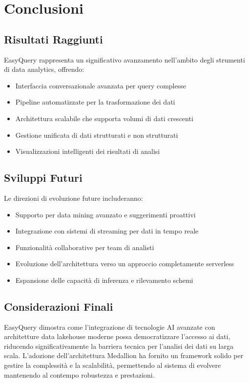 \documentclass[11pt,a4paper,twoside]{report}
\begin{document}
\chapter{Conclusioni}

\section{Risultati Raggiunti}
EasyQuery rappresenta un significativo avanzamento nell'ambito degli strumenti di data analytics, offrendo:
\begin{itemize}
    \item Interfaccia conversazionale avanzata per query complesse
    \item Pipeline automatizzate per la trasformazione dei dati
    \item Architettura scalabile che supporta volumi di dati crescenti
    \item Gestione unificata di dati strutturati e non strutturati
    \item Visualizzazioni intelligenti dei risultati di analisi
\end{itemize}

\section{Sviluppi Futuri}
Le direzioni di evoluzione future includeranno:
\begin{itemize}
    \item Supporto per data mining avanzato e suggerimenti proattivi 
    \item Integrazione con sistemi di streaming per dati in tempo reale
    \item Funzionalità collaborative per team di analisti
    \item Evoluzione dell'architettura verso un approccio completamente serverless
    \item Espansione delle capacità di inferenza e rilevamento schemi
\end{itemize}

\section{Considerazioni Finali}
EasyQuery dimostra come l'integrazione di tecnologie AI avanzate con architetture data lakehouse moderne possa democratizzare l'accesso ai dati, riducendo significativamente la barriera tecnica per l'analisi dei dati su larga scala. L'adozione dell'architettura Medallion ha fornito un framework solido per gestire la complessità e la scalabilità, permettendo al sistema di evolvere mantenendo al contempo robustezza e prestazioni.
\end{document}
